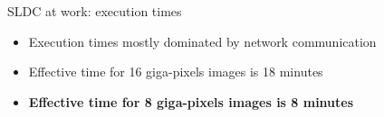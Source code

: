 \documentclass{beamer}
\begin{document}
\begin{frame}{SLDC at work: execution times}
	\begin{itemize}
		\item Execution times mostly dominated by network communication
		\item Effective time for 16 giga-pixels images is 18 minutes
		\item \textbf{Effective time for 8 giga-pixels images is 8 minutes}
	\end{itemize}
	
	\begin{figure}
		\hspace{0.5cm}
	\end{figure}
\end{frame}
\end{document}
